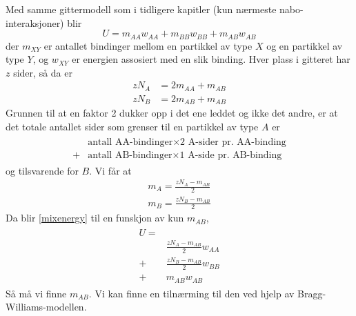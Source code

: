 Med samme gittermodell som i tidligere kapitler (kun nærmeste nabo-interaksjoner) blir
\begin{equation}
	\label{mixenergy}
	U=m_{AA}w_{AA}+m_{BB}w_{BB}+m_{AB}w_{AB}
\end{equation}
der $m_{XY}$ er antallet bindinger mellom en partikkel av type $X$ og en partikkel av type $Y$, og $w_{XY}$ er energien assosiert med en slik binding. Hver plass i gitteret har $z$ sider, så da er
\begin{align}
	zN_A&=2m_{AA}+m_{AB} \\
	zN_B&=2m_{AB}+m_{AB}
\end{align}
Grunnen til at en faktor 2 dukker opp i det ene leddet og ikke det andre, er at det totale antallet sider som grenser til en partikkel av type $A$ er 
\begin{align}
\begin{split}
	&\text{antall AA-bindinger}\times\text{2 A-sider pr. AA-binding} \\
	+&\text{antall AB-bindinger}\times\text{1 A-side pr. AB-binding}
\end{split}
\end{align}
og tilsvarende for $B$. Vi får at
\begin{align}
    m_A=\frac{zN_A-m_{AB}}{2} \\
    m_B=\frac{zN_B-m_{AB}}{2}
\end{align}
Da blir \eqref{mixenergy} til en funskjon av kun $m_{AB}$,
\begin{align}\begin{split}
	\label{mixenergy2}
	U=\\&\frac{zN_A-m_{AB}}{2}w_{AA}\\+&\frac{zN_B-m_{AB}}{2}w_{BB}\\+&m_{AB}w_{AB}
\end{split}\end{align}
Så må vi finne $m_{AB}$. Vi kan finne en tilnærming til den ved hjelp av Bragg-Williams-modellen.

